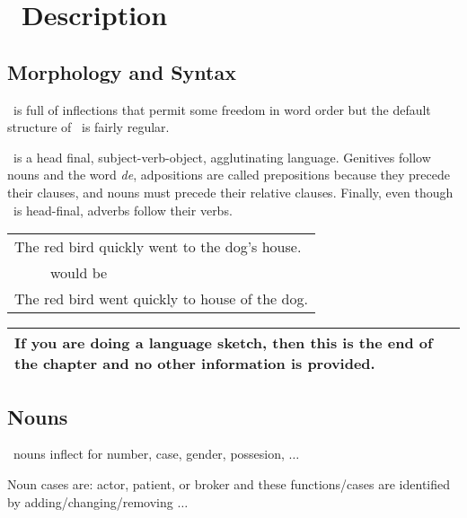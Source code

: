 
\chapter{\LanguageName\ Description}

\section{Morphology and Syntax}

\LanguageName\ is full of inflections that permit some freedom in word order but the default structure of \LanguageName\ is fairly regular.

\LanguageName\ is a head final, subject-verb-object, agglutinating language.
Genitives follow nouns and the word \emph{de},
adpositions are called prepositions because they precede their clauses,
and nouns must precede their relative clauses.
Finally, even though \LanguageName\ is head-final, adverbs follow their verbs.

\begin{center}
\begin{tabular}{l}
The red bird quickly went to the dog's house.\\
\ \ \ \ \ would be\\
The red bird went quickly to house of the dog.\\
\end{tabular}
\end{center}

\begin{center}
\begin{tabular}{|p{}|}
\hline
If you are doing a language sketch, then this is the end of the chapter and no other information is provided.
\\\hline
\end{tabular}
\end{center}

\section{Nouns}

\LanguageName\ nouns inflect for number, case, gender, possesion, $\ldots$

Noun cases are: actor, patient, or broker and these functions/cases are identified by adding/changing/removing $\ldots$

